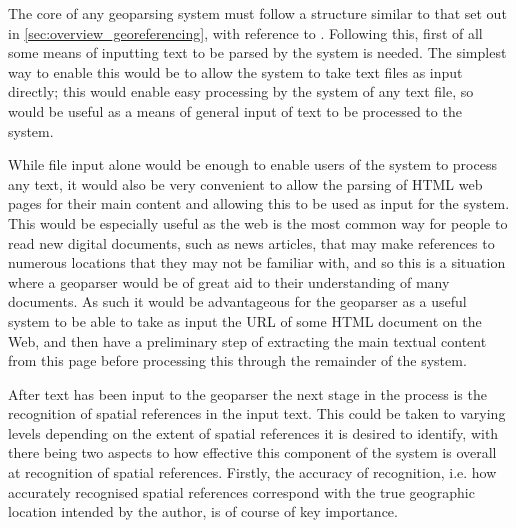 \documentclass[12pt, a4paper]{report}
\begin{document}


The core of any geoparsing system must follow a structure similar to that set out in \ref{sec:overview_georeferencing}, with reference to \citet{hill2006}. Following this, first of all some means of inputting text to be parsed by the system is needed. The simplest way to enable this would be to allow the system to take text files as input directly; this would enable easy processing by the system of any text file, so would be useful as a means of general input of text to be processed to the system.

While file input alone would be enough to enable users of the system to process any text, it would also be very convenient to allow the parsing of HTML web pages for their main content and allowing this to be used as input for the system. This would be especially useful as the web is the most common way for people to read new digital documents, such as news articles, that may make references to numerous locations that they may not be familiar with, and so this is a situation where a geoparser would be of great aid to their understanding of many documents. As such it would be advantageous for the geoparser as a useful system to be able to take as input the URL of some HTML document on the Web, and then have a preliminary step of extracting the main textual content from this page before processing this through the remainder of the system.

After text has been input to the geoparser the next stage in the process is the recognition of spatial references in the input text. This could be taken to varying levels depending on the extent of spatial references it is desired to identify, with there being two aspects to how effective this component of the system is overall at recognition of spatial references. Firstly, the accuracy of recognition, i.e. how accurately recognised spatial references correspond with the true geographic location intended by the author, is of course of key importance.
\end{document}
